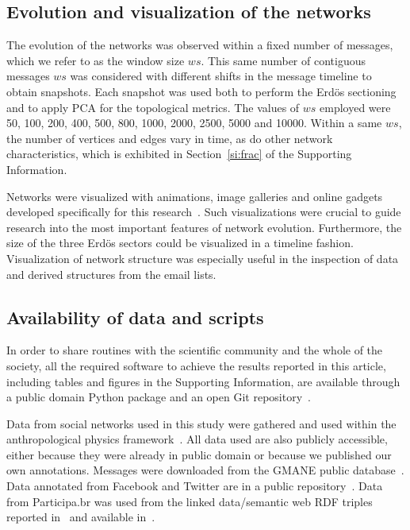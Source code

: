 \documentclass[%
	aip,
	jmp,%
	amsmath,amssymb,
	reprint,%
]{revtex4-1}
\begin{document}
\subsection{Evolution and visualization of the networks}\label{sec:viz}
The evolution of the networks was observed within a fixed number of messages, which we refer to as the window size $ws$. This same number of contiguous messages $ws$ was considered with different shifts in the message timeline to obtain snapshots. Each snapshot was used both to perform the Erd\"os sectioning and to apply PCA for the topological metrics.  
The values of $ws$ employed were 50, 100, 200, 400, 500, 800, 1000, 2000, 2500, 5000 and 10000. Within a same $ws$, the number of vertices and edges vary in time, as do other network characteristics, which is exhibited in Section~\ref{si:frac} of the Supporting Information. 

Networks were visualized with animations, image galleries and online gadgets developed specifically for this research~\cite{animacoes,galGMANE,appGMANE}. Such visualizations were crucial to guide research into the most important features of network evolution. Furthermore, the size of the three Erd\"os sectors could be visualized in a timeline fashion. Visualization of network structure was especially useful in the inspection of data and derived structures from the email lists.

\subsection{Availability of data and scripts}\label{scripts}
In order to share routines with the scientific community and the whole of the society,
all the required software to achieve the results reported in this article,
including tables and figures in the Supporting Information,
are available through a public domain Python package and an open Git repository~\cite{gmanePack}.

Data from social networks used in this study were gathered and used within the anthropological physics framework~\cite{anPhy}.
All data used are also publicly accessible, either because they were already in public domain or because
we published our own annotations.
Messages were downloaded from the GMANE public database~\cite{GMANEwikipedia}.
Data annotated from Facebook and Twitter are in a public repository~\cite{fbtwData}.
Data from Participa.br was used from the linked data/semantic web RDF triples
reported in~\cite{opa} and available in~\cite{datahub}.
\end{document}
